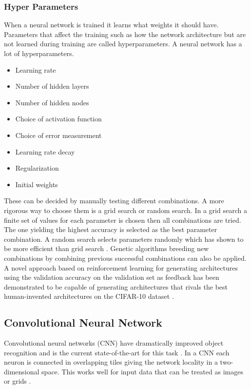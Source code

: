 \documentclass{kththesis}
\begin{document}
\subsubsection{Hyper Parameters}
When a neural network is trained it learns what weights it should have. Parameters that affect the training such as how the network architecture but are not learned during training are called hyperparameters. A neural network has a lot of hyperparameters.
\begin{itemize}
\item Learning rate
\item Number of hidden layers
\item Number of hidden nodes
\item Choice of activation function
\item Choice of error measurement
\item Learning rate decay
\item Regularization
\item Initial weights
\end{itemize}
These can be decided by manually testing different combinations. A more rigorous way to choose them is a grid search or random search. In a grid search a finite set of values for each parameter is chosen then all combinations are tried. The one yielding the highest accuracy is selected as the best parameter combination. A random search selects parameters randomly which has shown to be more efficient than grid search \cite{bergstra2012random}. Genetic algorithms breeding new combinations  by combining previous successful combinations can also be applied. A novel approach based on reinforcement learning for generating architectures using the validation accuracy  on the validation set as feedback has been demonstrated to be capable of generating architectures  that rivals the best human-invented architectures on the CIFAR-10 dataset \cite{DBLP:journals/corr/ZophL16}.

\subsection{Convolutional Neural Network}

Convolutional neural networks (CNN) have dramatically improved object recognition and is the current state-of-the-art for this task \cite{szegedy2015going}. In a CNN  each neuron is connected in overlapping tiles giving  the network  locality in a two-dimensional space. This works well for input data that can be treated as images or grids \cite{szegedy2015going}.
\end{document}
